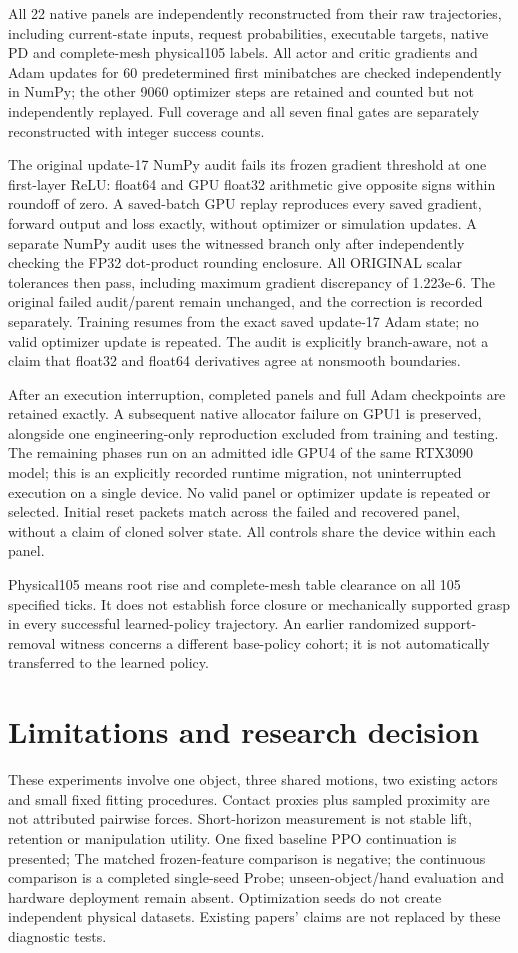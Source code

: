 \documentclass[10pt]{article}
\begin{document}
All 22 native panels are independently reconstructed from their raw
trajectories, including current-state inputs, request probabilities, executable
targets, native PD and complete-mesh physical105 labels. All actor and critic
gradients and Adam updates for 60 predetermined first minibatches are checked
independently in NumPy; the other 9060 optimizer steps are retained and counted
but not independently replayed. Full coverage and all seven final gates are
separately reconstructed with integer success counts.

The original update-17 NumPy audit fails its frozen gradient threshold at one
first-layer ReLU: float64 and GPU float32 arithmetic give opposite signs within
roundoff of zero. A saved-batch GPU replay reproduces every saved gradient,
forward output and loss exactly, without optimizer or simulation updates. A
separate NumPy audit uses the witnessed branch only after independently checking
the FP32 dot-product rounding enclosure. All ORIGINAL scalar tolerances then
pass, including maximum gradient discrepancy of 1.223e-6. The original failed
audit/parent remain unchanged, and the correction is recorded separately.
Training resumes from the exact saved update-17 Adam state; no valid optimizer
update is repeated. The audit is explicitly branch-aware, not a claim that
float32 and float64 derivatives agree at nonsmooth boundaries.

After an execution interruption, completed panels and full Adam checkpoints are
retained exactly. A subsequent native allocator failure on GPU1 is preserved,
alongside one engineering-only reproduction excluded from training and testing.
The remaining phases run on an admitted idle GPU4 of the same RTX3090 model;
this is an explicitly recorded runtime migration, not uninterrupted execution
on a single device. No valid panel or optimizer update is repeated or selected.
Initial reset packets match across the failed and recovered panel, without a
claim of cloned solver state. All controls share the device within each panel.

Physical105 means root rise and complete-mesh table clearance on all 105
specified ticks. It does not establish force closure or mechanically supported
grasp in every successful learned-policy trajectory. An earlier randomized
support-removal witness concerns a different base-policy cohort; it is not
automatically transferred to the learned policy.

\section{Limitations and research decision}
These experiments involve one object, three shared motions, two existing actors
and small fixed fitting procedures. Contact proxies plus sampled proximity are
not attributed pairwise forces. Short-horizon measurement is not stable lift,
retention or manipulation utility. One fixed baseline PPO continuation is presented; The matched frozen-feature comparison is negative; the continuous comparison is a completed single-seed Probe;
unseen-object/hand evaluation and hardware deployment remain absent. Optimization seeds do not create independent
physical datasets. Existing papers' claims are not replaced by these diagnostic tests.
\end{document}
